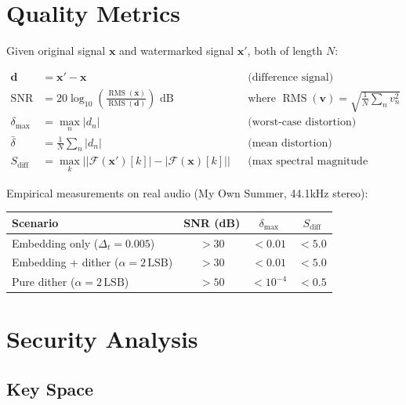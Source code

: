 \documentclass[11pt,a4paper]{article}
\newcommand{\F}{\mathcal{F}}
\newcommand{\abs}[1]{\left| #1 \right|}
\DeclareMathOperator{\rms}{RMS}
\DeclareMathOperator{\snr}{SNR}
\begin{document}
\section{Quality Metrics}
\label{sec:quality}

Given original signal $\mathbf{x}$ and watermarked signal $\mathbf{x}'$,
both of length $N$:

\begin{align}
    \mathbf{d} &= \mathbf{x}' - \mathbf{x} && \text{(difference signal)} \\[4pt]
    \snr &= 20 \log_{10}\!\left(\frac{\rms(\mathbf{x})}{\rms(\mathbf{d})}\right) \text{ dB}
    && \text{where } \rms(\mathbf{v}) = \sqrt{\frac{1}{N}\sum_{n} v_n^2} \\[4pt]
    \delta_{\max} &= \max_n \abs{d_n} && \text{(worst-case distortion)} \\[4pt]
    \bar{\delta} &= \frac{1}{N}\sum_n \abs{d_n} && \text{(mean distortion)} \\[4pt]
    S_\text{diff} &= \max_k \abs{|\F(\mathbf{x}')[k]| - |\F(\mathbf{x})[k]|}
    && \text{(max spectral magnitude difference)}
\end{align}

Empirical measurements on real audio (My Own Summer, 44.1kHz stereo):
\begin{center}
\begin{tabular}{@{}lccc@{}}
\toprule
Scenario & SNR (dB) & $\delta_{\max}$ & $S_{\text{diff}}$ \\
\midrule
Embedding only ($\Delta_t = 0.005$) & $> 30$ & $< 0.01$ & $< 5.0$ \\
Embedding + dither ($\alpha = 2\,\text{LSB}$) & $> 30$ & $< 0.01$ & $< 5.0$ \\
Pure dither ($\alpha = 2\,\text{LSB}$) & $> 50$ & $< 10^{-4}$ & $< 0.5$ \\
\bottomrule
\end{tabular}
\end{center}


\section{Security Analysis}
\label{sec:security}

\subsection{Key Space}
\end{document}

